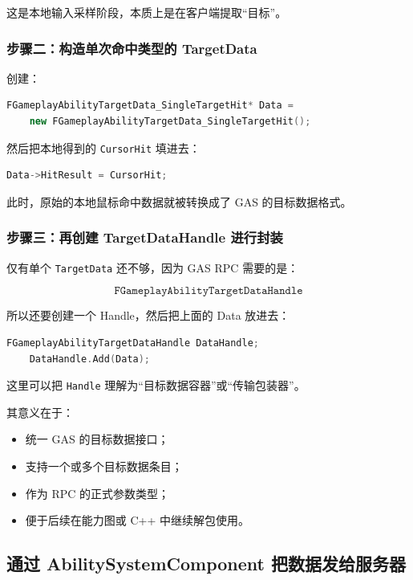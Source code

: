 \documentclass[10pt,CJKmath]{ctexart}
\begin{document}
这是本地输入采样阶段，本质上是在客户端提取“目标”。

\subsubsection{步骤二：构造单次命中类型的 TargetData}

创建：

\begin{lstlisting}[language=C++,basicstyle=\ttfamily\small]
	FGameplayAbilityTargetData_SingleTargetHit* Data =
	new FGameplayAbilityTargetData_SingleTargetHit();
\end{lstlisting}

然后把本地得到的 \texttt{CursorHit} 填进去：

\begin{lstlisting}[language=C++,basicstyle=\ttfamily\small]
	Data->HitResult = CursorHit;
\end{lstlisting}

此时，原始的本地鼠标命中数据就被转换成了 GAS 的目标数据格式。

\subsubsection{步骤三：再创建 TargetDataHandle 进行封装}

仅有单个 \texttt{TargetData} 还不够，因为 GAS RPC 需要的是：

\[
\texttt{FGameplayAbilityTargetDataHandle}
\]

所以还要创建一个 Handle，然后把上面的 Data 放进去：

\begin{lstlisting}[language=C++,basicstyle=\ttfamily\small]
	FGameplayAbilityTargetDataHandle DataHandle;
	DataHandle.Add(Data);
\end{lstlisting}

这里可以把 \texttt{Handle} 理解为“目标数据容器”或“传输包装器”。

其意义在于：

\begin{itemize}
	\item 统一 GAS 的目标数据接口；
	\item 支持一个或多个目标数据条目；
	\item 作为 RPC 的正式参数类型；
	\item 便于后续在能力图或 C++ 中继续解包使用。
\end{itemize}

\subsection{通过 AbilitySystemComponent 把数据发给服务器}
\end{document}
